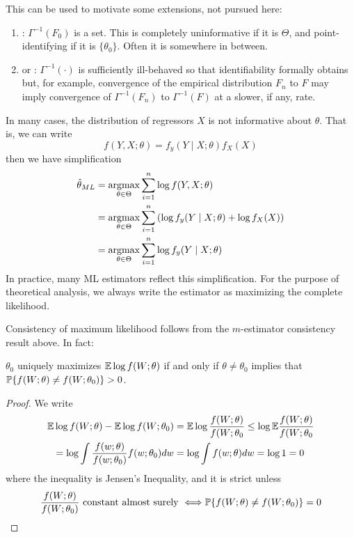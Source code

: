 \documentclass[10pt]{article}
\begin{document}
\begin{remark}
	This can be used to motivate some extensions, not pursued here:
	\begin{enumerate}
		\item {}: $\Gamma^{-1}(F_0)$ is a set. This is completely uninformative if it is $\Theta$, and point-identifying if it is $\{\theta_0\}$. Often it is somewhere in between.
		\item {} or : $\Gamma^{-1}(\cdot)$ is sufficiently ill-behaved so that identifiability formally obtains but, for example, convergence of the empirical distribution $F_n$ to $F$ may imply convergence of $\Gamma^{-1}(F_n)$ to $\Gamma^{-1}(F)$ at a slower, if any, rate.
	\end{enumerate}
\end{remark}
\begin{remark}
	In many cases, the distribution of regressors $X$ is not informative about $\theta$. That is, we can write \[f(Y,X;\theta) = f_y(Y\mid X;\theta) f_X(X)\]then we have simplification 
	\begin{align*}
		\hat{\theta}_{ML} &= \mathop{\rm argmax}_{\theta\in\Theta} \sum_{i=1}^n \log f(Y,X;\theta) \\ &= \mathop{\rm argmax}_{\theta\in\Theta} \sum_{i=1}^n \left( \log f_y(Y\mid X;\theta) + \log f_X(X)\right) \\
		&= \mathop{\rm argmax}_{\theta\in\Theta} \sum_{i=1}^n \log f_y(Y \mid X;\theta)
	\end{align*}
	In practice, many ML estimators reflect this simplification. For the purpose of theoretical analysis, we always write the estimator as maximizing the complete likelihood.
\end{remark}

Consistency of maximum likelihood follows from the $m$-estimator consistency result above. In fact:

\begin{theorem}
	$\theta_0$ uniquely maximizes $\mathbb{E} \log f(W;\theta)$ if and only if $\theta \ne \theta_0$ implies that $\mathbb{P}\{f(W;\theta) \ne f(W;\theta_0)\} > 0$.
\end{theorem}
\begin{proof}
	We write
	\begin{align*}
		\mathbb{E} \log f(W;\theta) - \mathbb{E} \log f(W;\theta_0) &= \mathbb{E} \log \frac{f(W;\theta)}{f(W;\theta_0} \le \log \mathbb{E} \frac{f(W;\theta)}{f(W;\theta_0} \\
		= \log \int \frac{f(w;\theta)}{f(w;\theta_0)} f(w;\theta_0)dw &= \log \int f(w;\theta) dw = \log 1 = 0
	\end{align*}
	where the inequality is Jensen's Inequality, and it is strict unless \[\frac{f(W;\theta)}{f(W;\theta_0)} \text{ constant almost surely } \Longleftrightarrow \mathbb{P}\{f(W;\theta) \ne f(W;\theta_0)\} = 0\]
\end{proof}
\end{document}
